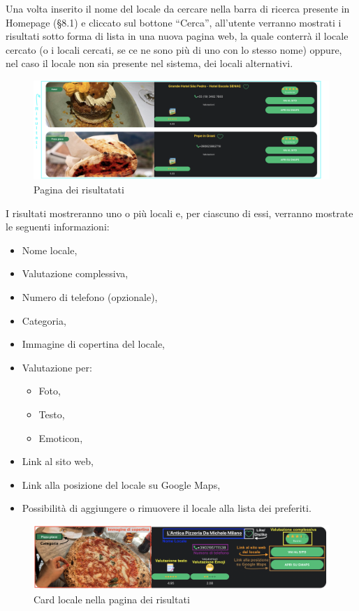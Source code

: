 
Una volta inserito il nome del locale da cercare nella barra di ricerca presente in Homepage (\S{8.1}) e cliccato sul bottone “Cerca”, all’utente verranno mostrati i risultati sotto forma di lista in una nuova pagina web, la quale conterrà il locale cercato (o i locali cercati, se ce ne sono più di uno con lo stesso nome) oppure, nel caso il locale non sia presente nel sistema, dei locali alternativi.

\begin{figure}[H]
\centering
\includegraphics[scale=0.3]{./images/Ricerca/Ricerca.png} 
\caption{Pagina dei risultatati}
\end{figure}

I risultati mostreranno uno o più locali e, per ciascuno di essi, verranno mostrate le seguenti informazioni:

\begin{itemize}
\item Nome locale,
\item Valutazione complessiva,
\item Numero di telefono (opzionale),
\item Categoria,
\item Immagine di copertina del locale,
\item Valutazione per:
\begin{itemize}
\item Foto,
\item Testo,
\item Emoticon,
\end{itemize}
\item Link al sito web,
\item Link alla posizione del locale su Google Maps,
\item Possibilità di aggiungere o rimuovere il locale alla lista dei preferiti.
\end{itemize}

\begin{figure}[H]
\centering
\includegraphics[scale=0.4]{./images/Ricerca/Card.png} 
\caption{Card locale nella pagina dei risultati}
\end{figure}

